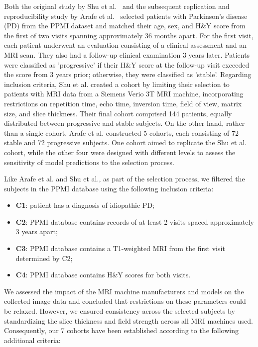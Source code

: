 Both the original study by Shu et al.~\cite{shu2021predicting} and the subsequent replication and reproducibility study by 
Arafe et al.~\cite{Arafe2023.05.05.539590} selected patients with Parkinson's disease (PD) from the PPMI dataset and matched their 
age, sex, and H\&Y score from the first of two visits spanning approximately 36 months apart. For the first visit, each patient 
underwent an evaluation consisting of a clinical assessment and an MRI scan. They also had a follow-up clinical examination 3 years later. 
Patients were classified as 'progressive' if their H\&Y score at the follow-up visit exceeded the score from 3 years prior; otherwise, they 
were classified as 'stable'. Regarding inclusion criteria, Shu et al. created a cohort by limiting their selection to patients with MRI data 
from a Siemens Verio 3T MRI machine, incorporating restrictions on repetition time, echo time, inversion time, field of view, matrix size, 
and slice thickness. Their final cohort comprised 144 patients, equally distributed between progressive and stable subjects. 
On the other hand, rather than a single cohort, Arafe et al. constructed 5 cohorts, each consisting of 72 stable and 72 progressive subjects. One 
cohort aimed to replicate the Shu et al. cohort, while the other four were designed with different levels to assess the sensitivity of model predictions to 
the selection process.

Like Arafe et al. and Shu et al., as part of the selection process, we filtered the subjects in the PPMI database using the 
following inclusion criteria:
\begin{itemize}
  \item \textbf{C1}: patient has a diagnosis of idiopathic PD;
  \item \textbf{C2}: PPMI database contains records of at least 2 visits spaced approximately 3 years apart;
  \item \textbf{C3}: PPMI database contains a T1-weighted MRI from the first visit determined by C2;
  \item \textbf{C4}: PPMI database contains H\&Y scores for both visits. 
\end{itemize}

We assessed the impact of the MRI machine manufacturers and models on the collected image data and concluded that restrictions on these parameters could be relaxed. 
However, we ensured consistency across the selected subjects by standardizing the slice thickness and field strength across all MRI machines used. Consequently, our 7 
cohorts have been established according to the following additional criteria:

